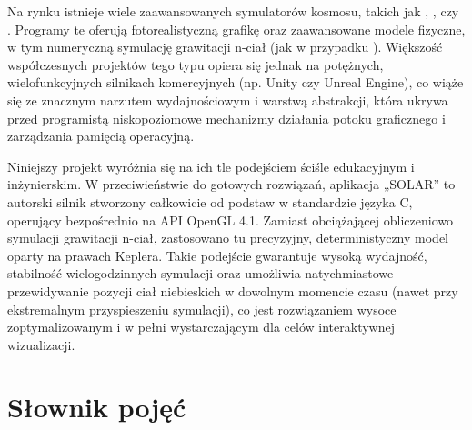      Na rynku istnieje wiele zaawansowanych symulatorów kosmosu, takich jak , ,  czy . 
     Programy te oferują fotorealistyczną grafikę oraz zaawansowane modele fizyczne, w tym numeryczną symulację grawitacji n-ciał (jak w przypadku ).
     Większość współczesnych projektów tego typu opiera się jednak na potężnych, wielofunkcyjnych silnikach komercyjnych (np. Unity czy Unreal Engine), co wiąże się ze znacznym narzutem wydajnościowym i warstwą abstrakcji, która ukrywa przed programistą niskopoziomowe mechanizmy działania potoku graficznego i zarządzania pamięcią operacyjną.

     Niniejszy projekt wyróżnia się na ich tle podejściem ściśle edukacyjnym i inżynierskim. 
     W przeciwieństwie do gotowych rozwiązań, aplikacja „SOLAR” to autorski silnik stworzony całkowicie od podstaw w standardzie języka C, operujący bezpośrednio na API OpenGL 4.1.
     Zamiast obciążającej obliczeniowo symulacji grawitacji n-ciał, zastosowano tu precyzyjny, deterministyczny model oparty na prawach Keplera.
     Takie podejście gwarantuje wysoką wydajność, stabilność wielogodzinnych symulacji oraz umożliwia natychmiastowe przewidywanie pozycji ciał niebieskich w dowolnym momencie czasu (nawet przy ekstremalnym przyspieszeniu symulacji), co jest rozwiązaniem wysoce zoptymalizowanym i w pełni wystarczającym dla celów interaktywnej wizualizacji.

    \section{Słownik pojęć}

